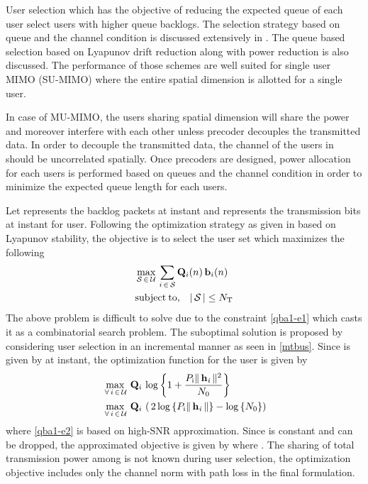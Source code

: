 
User selection which has the objective of reducing the expected queue of each user select users with higher queue backlogs. The selection strategy based on queue and the channel condition is discussed extensively in \cite{neely2012stability}. The queue based selection based on Lyapunov drift reduction along with power reduction is also discussed. The performance of those schemes are well suited for single user MIMO (SU-MIMO) where the entire spatial dimension is allotted for a single user.

In case of MU-MIMO, the users sharing spatial dimension will share the power and moreover interfere with each other unless precoder decouples the transmitted data. In order to decouple the transmitted data, the channel of the users in  should be uncorrelated spatially. Once precoders are designed, power allocation for each users is performed based on queues and the channel condition in order to minimize the expected queue length for each users.

Let  represents the backlog packets at  instant and  represents the transmission bits at  instant for  user. Following the optimization strategy as given in \cite{neely2012stability} based on Lyapunov stability, the objective is to select the user set  which maximizes the following
\begin{eqnarray}
&\displaystyle \max_{\mathcal{S} \, \in \, \mathcal{U}} \, \sum_{i \, \in \, \mathcal{S}}\mathbf{Q}_i(n) \, \mathbf{b}_i(n) \\
&\displaystyle \mathrm{subject \: to,} \quad | \, \mathcal{S} \, | \leq N_{\mathrm{T}}
\label{qba1-e1}
\end{eqnarray}
The above problem is difficult to solve due to the constraint \eqref{qba1-e1} which casts it as a combinatorial search problem. The suboptimal solution is proposed by considering user selection in an incremental manner as seen in \ref{mtbus}. Since  is given by  at  instant, the optimization function for the user  is given by
\begin{eqnarray}
&\displaystyle \max_{\, \forall \, i \, \in \, \mathcal{U}} \, \mathbf{Q}_i \, \log \left \lbrace 1 + \frac{P_{\mathrm{i}}\|\, \mathbf{h}_{\mathit{i}} \,\|^2}{N_{\mathrm{0}}} \right \rbrace \\
&\displaystyle \max_{\, \forall \, i \, \in \, \mathcal{U}} \, \mathbf{Q}_i \, \left ( \, 2 \log \left \lbrace P_{\mathrm{i}}\|\, \mathbf{h}_{\mathit{i}} \,\| \right \rbrace - \log \left \lbrace N_{\mathrm{0}} \right \rbrace \right )
\label{qba1-e2}
\end{eqnarray}
where \eqref{qba1-e2} is based on high-SNR approximation. Since  is constant and can be dropped, the approximated objective is given by  where . The sharing of total transmission power among  is not known during user selection, the optimization objective includes only the channel norm with path loss in the final formulation. 

